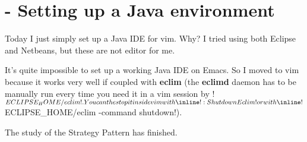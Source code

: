 \section{ - Setting up a Java environment}

Today I just simply set up a Java IDE for vim. Why? I tried using both
Eclipse and Netbeans, but these are not editor for me.

It's quite impossible to set up a working Java IDE on Emacs. So I
moved to vim because it works very well if coupled with \textbf{eclim}
(the \textbf{eclimd} daemon has to be manually run every time you need
it in a vim session by
\inline!$ECLIPSE_HOME/eclim!. You can the stop it inside vim with
\inline!:ShutdownEclim! or with
\inline!$ECLIPSE_HOME/eclim -command shutdown!).

The study of the Strategy Pattern has finished.
